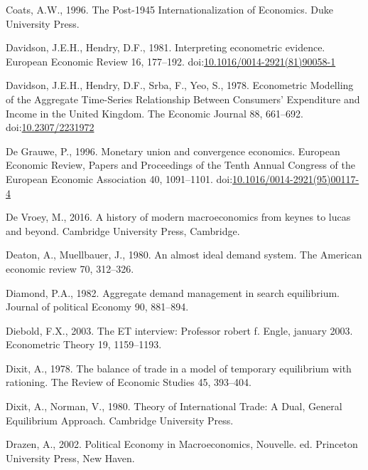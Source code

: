 \documentclass[
  12pt,
  onecolumn]{article}
\newlength{\cslhangindent}
\newlength{\cslentryspacingunit} %
\newenvironment{CSLReferences}[2] %
 {%
  \setlength{\parindent}{0pt}
  \ifodd #1
  \let\oldpar\par
  \def\par{\hangindent=\cslhangindent\oldpar}
  \fi
  \setlength{\parskip}{#2\cslentryspacingunit}
 }%
 {}
\begin{document}
\begin{CSLReferences}{1}{0}
\leavevmode{}%
Coats, A.W., 1996. The Post-1945 Internationalization of Economics. Duke University Press.

\leavevmode{}%
Davidson, J.E.H., Hendry, D.F., 1981. Interpreting econometric evidence. European Economic Review 16, 177--192. doi:\href{https://doi.org/10.1016/0014-2921(81)90058-1}{10.1016/0014-2921(81)90058-1}

\leavevmode{}%
Davidson, J.E.H., Hendry, D.F., Srba, F., Yeo, S., 1978. Econometric {Modelling} of the {Aggregate Time-Series Relationship Between Consumers}' {Expenditure} and {Income} in the {United Kingdom}. The Economic Journal 88, 661--692. doi:\href{https://doi.org/10.2307/2231972}{10.2307/2231972}

\leavevmode{}%
De Grauwe, P., 1996. Monetary union and convergence economics. European Economic Review, Papers and {Proceedings} of the {Tenth Annual Congress} of the {European Economic Association} 40, 1091--1101. doi:\href{https://doi.org/10.1016/0014-2921(95)00117-4}{10.1016/0014-2921(95)00117-4}

\leavevmode{}%
De Vroey, M., 2016. A history of modern macroeconomics from keynes to lucas and beyond. Cambridge University Press, Cambridge.

\leavevmode{}%
Deaton, A., Muellbauer, J., 1980. An almost ideal demand system. The American economic review 70, 312--326.

\leavevmode{}%
Diamond, P.A., 1982. Aggregate demand management in search equilibrium. Journal of political Economy 90, 881--894.

\leavevmode{}%
Diebold, F.X., 2003. The {ET} interview: {Professor} robert f. Engle, january 2003. Econometric Theory 19, 1159--1193.

\leavevmode{}%
Dixit, A., 1978. The balance of trade in a model of temporary equilibrium with rationing. The Review of Economic Studies 45, 393--404.

\leavevmode{}%
Dixit, A., Norman, V., 1980. Theory of {International Trade}: {A Dual}, {General Equilibrium Approach}. {Cambridge University Press}.

\leavevmode{}%
Drazen, A., 2002. Political {Economy} in {Macroeconomics}, Nouvelle. ed. {Princeton University Press}, {New Haven}.


\end{CSLReferences}
\end{document}
